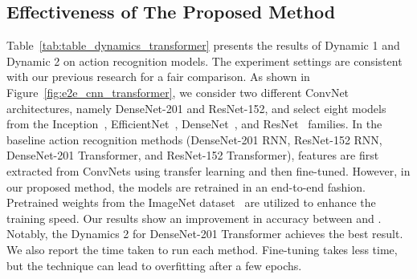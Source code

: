 \documentclass[fleqn,10pt]{wlscirep}
\begin{document}
\subsection{Effectiveness of The Proposed Method}


Table~\ref{tab:table_dynamics_transformer} presents the results of Dynamic 1 and Dynamic 2 on action recognition models. The experiment settings are consistent with our previous research for a fair comparison. As shown in Figure~\ref{fig:e2e_cnn_transformer}, we consider two different ConvNet architectures, namely DenseNet-201 and ResNet-152, and select eight models from the Inception~\cite{szegedy2016rethinking}, EfficientNet~\cite{tan2019efficientnet}, DenseNet~\cite{huang2017densely}, and ResNet~\cite{he2016deep} families. In the baseline action recognition methods (DenseNet-201 RNN, ResNet-152 RNN, DenseNet-201 Transformer, and ResNet-152 Transformer), features are first extracted from ConvNets using transfer learning and then fine-tuned. However, in our proposed method, the models are retrained in an end-to-end fashion. Pretrained weights from the ImageNet dataset~\cite{krizhevsky2012imagenet} are utilized to enhance the training speed. Our results show an improvement in accuracy between  and . Notably, the Dynamics 2 for DenseNet-201 Transformer achieves the best result. We also report the time taken to run each method. Fine-tuning takes less time, but the technique can lead to overfitting after a few epochs.
\end{document}
